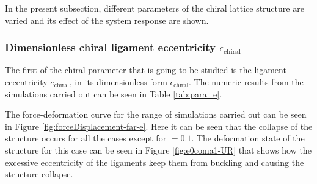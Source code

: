    In the present subsection, different parameters of the chiral lattice structure are varied and its effect of the system response are shown.

    \subsubsection{Dimensionless chiral ligament eccentricity $\epsilon_{\mathrm{chiral}}$}

      The first of the chiral parameter that is going to be studied is the ligament eccentricity $e_{\mathrm{chiral}}$, in its dimensionless form $\epsilon_{\mathrm{chiral}}$. The numeric results from the simulations carried out can be seen in Table \ref{tab:para_e}.

      The force-deformation curve for the range of simulations carried out can be seen in Figure \ref{fig:forceDisplacement-far-e}. Here it can be seen that the collapse of the structure occurs for all the cases except for \chie$= 0.1$. The deformation state of the structure for this case can be seen in Figure \ref{fig:e0coma1-UR} that shows how the excessive eccentricity of the ligaments keep them from buckling and causing the structure collapse.


